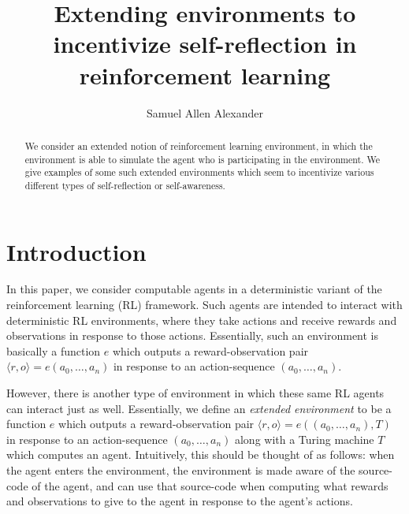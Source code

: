 \documentclass[runningheads]{llncs}
\begin{document}
\title{Extending environments to incentivize self-reflection
in reinforcement learning}

\author{Samuel Allen Alexander}

\maketitle

\begin{abstract}
    We consider an extended notion
    of reinforcement learning environment, in which the environment is able
    to simulate the agent who is participating in the environment. We give
    examples of some such extended environments which seem to incentivize
    various different types of self-reflection or self-awareness.
\end{abstract}

\section{Introduction}

In this paper, we consider computable agents in a deterministic variant of the reinforcement
learning (RL) framework. Such agents are intended to interact with deterministic RL
environments, where they take actions and receive rewards and observations in
response to those actions. Essentially, such an environment is basically a function $e$
which outputs a reward-observation pair
$\langle r,o\rangle=e(a_0,\ldots,a_n)$ in response to an action-sequence $(a_0,\ldots,a_n)$.

However, there is another type of environment in which these
same RL agents can interact just as well. Essentially, we define an \emph{extended
environment} to be a function $e$ which outputs a reward-observation pair
$\langle r,o\rangle=e((a_0,\ldots,a_n), T)$ in response to an action-sequence
$(a_0,\ldots,a_n)$ along with a Turing machine $T$ which computes an agent.
Intuitively, this should be thought of as follows: when the agent enters the environment,
the environment is made aware of the source-code of the agent, and can use that
source-code when computing what rewards and observations to give to the agent in response
to the agent's actions.
\end{document}
